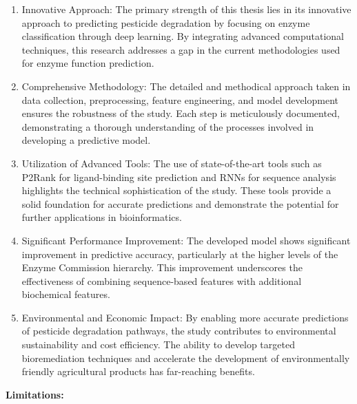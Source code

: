 \begin{enumerate}
    \item Innovative Approach: The primary strength of this thesis lies in its innovative approach to predicting pesticide degradation by focusing on enzyme classification through deep learning. By integrating advanced computational techniques, this research addresses a gap in the current methodologies used for enzyme function prediction.
    \item Comprehensive Methodology: The detailed and methodical approach taken in data collection, preprocessing, feature engineering, and model development ensures the robustness of the study. Each step is meticulously documented, demonstrating a thorough understanding of the processes involved in developing a predictive model.
    \item Utilization of Advanced Tools: The use of state-of-the-art tools such as P2Rank for ligand-binding site prediction and RNNs for sequence analysis highlights the technical sophistication of the study. These tools provide a solid foundation for accurate predictions and demonstrate the potential for further applications in bioinformatics.
    \item Significant Performance Improvement: The developed model shows significant improvement in predictive accuracy, particularly at the higher levels of the Enzyme Commission hierarchy. This improvement underscores the effectiveness of combining sequence-based features with additional biochemical features.
    \item Environmental and Economic Impact: By enabling more accurate predictions of pesticide degradation pathways, the study contributes to environmental sustainability and cost efficiency. The ability to develop targeted bioremediation techniques and accelerate the development of environmentally friendly agricultural products has far-reaching benefits.
\end{enumerate}

\textbf{Limitations:}

